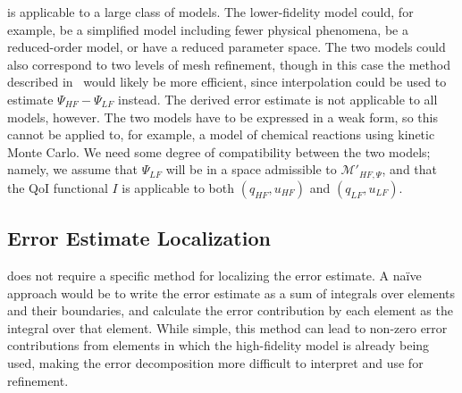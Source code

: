 %

 is applicable to a large class of models. The lower-fidelity model could, for example, be a simplified model including fewer physical phenomena, be a reduced-order model, or have a reduced parameter space. The two models could also correspond to two levels of mesh refinement, though in this case the method described in~\cite{BecVex05} would likely be more efficient, since interpolation could be used to estimate $\Psi_{HF}-\Psi_{LF}$ instead. The derived error estimate is not applicable to all models, however. The two models have to be expressed in a weak form, so this cannot be applied to, for example, a model of chemical reactions using kinetic Monte Carlo. We need some degree of compatibility between the two models; namely, we assume that $\Psi_{LF}$ will be in a space admissible to $\mathcal{M}'_{HF,\Psi}$, and that the QoI functional $I$ is applicable to both $(q_{HF},u_{HF})$ and $(q_{LF},u_{LF})$.

\subsection{Error Estimate Localization}\label{sec:errLocal}

 does not require a specific method for localizing the error estimate. A na\"{i}ve approach would be to write the error estimate as a sum of integrals over elements and their boundaries, and calculate the error contribution by each element as the integral over that element. While simple, this method can lead to non-zero error contributions from elements in which the high-fidelity model is already being used, making the error decomposition more difficult to interpret and use for refinement.

